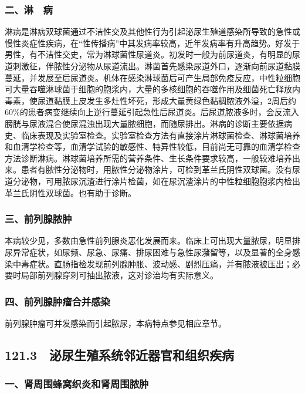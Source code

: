 \subsubsection{二、淋　病}

淋病是淋病双球菌通过不洁性交及其他性行为引起泌尿生殖道感染所导致的急性或慢性炎症性疾病，在“性传播病”中其发病率较高，近年发病率有升高趋势。好发于男性，有不洁性交史，常为淋球菌性尿道炎。初发时一般为前尿道炎，有明显的尿道刺激征，伴脓性分泌物从尿道流出。淋菌首先感染尿道外口，逐渐向前尿道黏膜蔓延，并发展至后尿道炎。机体在感染淋球菌后可产生局部免疫反应，中性粒细胞可大量吞噬淋球菌于细胞的胞浆内，大量的多核细胞的吞噬作用及细菌死亡释放内毒素，使尿道黏膜上皮发生多灶性坏死，形成大量黄绿色黏稠脓液外溢，2周后约60\%的患者病变继续向上逆行蔓延引起急性后尿道炎。后尿道脓液多时，会反流入膀胱与尿液混合使尿混浊出现大量脓细胞，而随尿排出。淋病的诊断主要依据病史、临床表现及实验室检查。实验室检查方法有直接涂片淋球菌检查、淋球菌培养和血清学检查等，血清学试验的敏感性、特异性较低，目前尚无可靠的血清学检查方法诊断淋病。淋球菌培养所需的营养条件、生长条件要求较高，一般较难培养出来。患者有脓性分泌物时，用脓性分泌物涂片，可检到革兰氏阴性双球菌。没有尿道分泌物，可用脓尿沉渣进行涂片检菌，如在尿沉渣涂片的中性粒细胞胞浆内检出革兰氏阴性双球菌。也有助于诊断。

\subsubsection{三、前列腺脓肿}

本病较少见，多数由急性前列腺炎恶化发展而来。临床上可出现大量脓尿，明显排尿异常症状，如尿频、尿急、尿痛、排尿困难与急性尿潴留等，以及显著的全身感染中毒症状。直肠指检发现前列腺肿胀、波动感、剧烈压痛，并有脓液被压出；必要时局部前列腺穿刺可抽出脓液，这对诊治均有实际意义。

\subsubsection{四、前列腺肿瘤合并感染}

前列腺肿瘤可并发感染而引起脓尿，本病特点参见相应章节。

\protect\hypertarget{text00285.html}{}{}

\subsection{121.3　泌尿生殖系统邻近器官和组织疾病}

\subsubsection{一、肾周围蜂窝织炎和肾周围脓肿}

